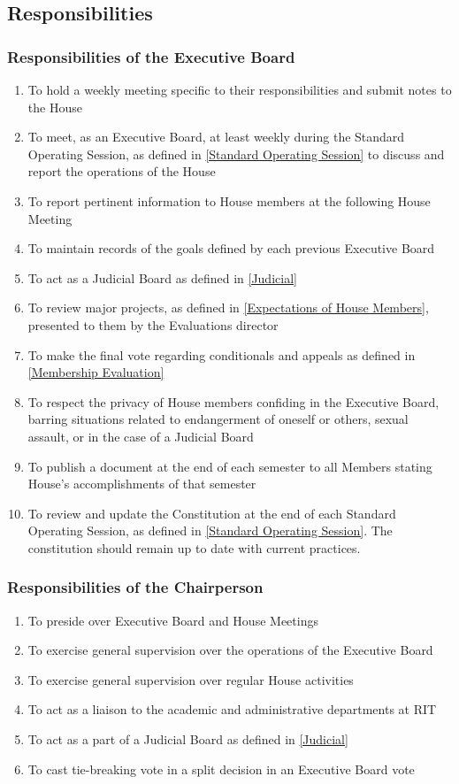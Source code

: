 \documentclass{article}
\newcommand{\asection}[1]{\subsection{#1} \label{#1}}
\newcommand{\asubsection}[1]{\subsubsection{#1} \label{#1}}
\begin{document}
\asection{Responsibilities}
\renewcommand{\theenumi}{\alph{enumi}} %
\asubsection{Responsibilities of the Executive Board}
\begin{enumerate}
	\item To hold a weekly meeting specific to their responsibilities and submit notes to the House
	\item To meet, as an Executive Board, at least weekly during the Standard Operating Session, as defined in \ref{Standard Operating Session} to discuss and report the operations of the House
	\item To report pertinent information to House members at the following House Meeting
	\item To maintain records of the goals defined by each previous Executive Board
	\item To act as a Judicial Board as defined in \ref{Judicial}
	\item To review major projects, as defined in \ref{Expectations of House Members}, presented to them by the Evaluations director
	\item To make the final vote regarding conditionals and appeals as defined in \ref{Membership Evaluation}
	\item To respect the privacy of House members confiding in the Executive Board, barring situations related to endangerment of oneself or others, sexual assault, or in the case of a Judicial Board
	\item To publish a document at the end of each semester to all Members stating House’s accomplishments of that semester
	\item To review and update the Constitution at the end of each Standard Operating Session, as defined in \ref{Standard Operating Session}.
		The constitution should remain up to date with current practices.
\end{enumerate}

\asubsection{Responsibilities of the Chairperson}
\begin{enumerate}
	\item To preside over Executive Board and House Meetings
	\item To exercise general supervision over the operations of the Executive Board
	\item To exercise general supervision over regular House activities
	\item To act as a liaison to the academic and administrative departments at RIT
	\item To act as a part of a Judicial Board as defined in \ref{Judicial}
	\item To cast tie-breaking vote in a split decision in an Executive Board vote
\end{enumerate}
\end{document}
